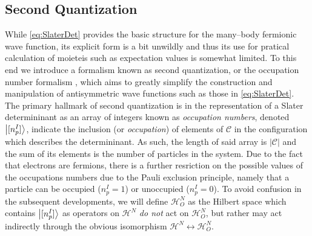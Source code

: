 \subsection{Second Quantization}
\label{sec:SQ}

While \cref{eq:SlaterDet} provides the basic structure for the many--body fermionic wave function, its explicit form
is a bit unwildly and thus its use for pratical calculation of moieteis such as expectation values is somewhat limited.
To this end we introduce a formalism known as second quantization, or the occupation number formalism \cite{Walecka12_book},
which aims to greatly simplify the construction and manipulation of antisymmetric wave functions such as those in 
\cref{eq:SlaterDet}. The primary hallmark of second quantization is in the representation of a Slater determininant 
as an array of integers known as \emph{occupation numbers}, denoted $\left\vert [n_p^I] \right\rangle$, indicate the inclusion (or \emph{occupation}) of elements
of $\mathcal{C}$ in the configuration which describes the determininant. As such, the length of said array is $\vert \mathcal{C} \vert$
and the sum of its elements is the number of particles in the system. Due to the fact that electrons are fermions,
there is a further resriction on the possible values of the occupations numbers due to the Pauli exclusion principle,
namely that a particle can be occupied ($n^I_p=1$) or unoccupied ($n^I_p=0$). To avoid confusion in the subsequent developments,
we will define $\mathcal{H}^N_O$ as the Hilbert space which contains $\left\vert [n_p^I] \right\rangle$ as operators on $\mathcal{H}^N$ 
\emph{do not} act on $\mathcal{H}^N_O$, but rather may act indirectly through the obvious isomorphism 
$\mathcal{H}^N \leftrightarrow \mathcal{H}^N_O$.

